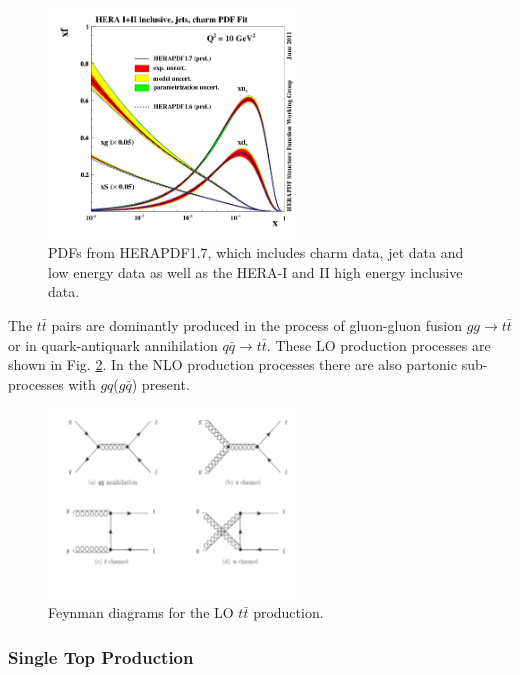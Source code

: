 \begin{figure}[h]
  \centering
  \includegraphics[width=0.6\textwidth]{01_Theory_SM/plots/herapdf17.png}
  \caption{PDFs from HERAPDF1.7, which includes charm data, jet data and low energy data as well as the HERA-I and II high energy inclusive data.}
  \label{fig:HERA_PDF}
\end{figure}

The $t\bar{t}$ pairs are dominantly produced in the process of gluon-gluon fusion $gg \rightarrow t\bar{t}$ or in quark-antiquark annihilation $q\bar{q} \rightarrow t\bar{t}$.
These LO production processes are shown in Fig. \ref{fig:LO_tt_prod}. In the NLO production processes there are also partonic sub-processes with $gq$($g\bar{q}$) present.

\begin{figure}[h]
  \centering
  \includegraphics[width=0.6\textwidth]{01_Theory_SM/plots/LO_tt_production.pdf}
  \caption{Feynman diagrams for the LO $t\bar{t}$ production.}
  \label{fig:LO_tt_prod}
\end{figure}

\subsubsection{Single Top Production}

